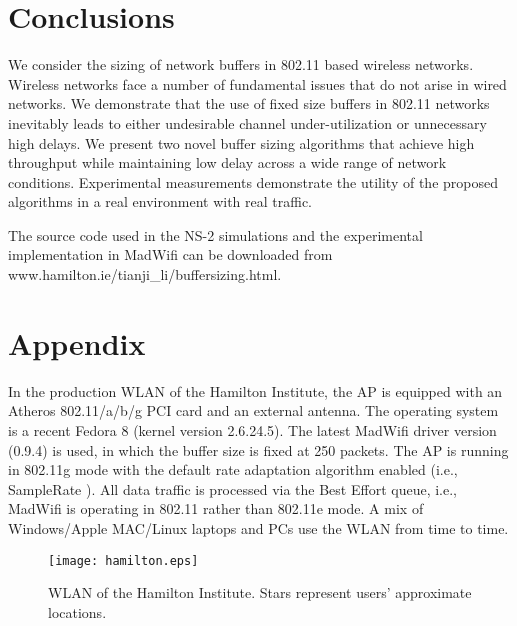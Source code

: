 \documentclass[10pt,twocolumn, journal]{IEEEtran}
\begin{document}
\section{Conclusions } \label{sec_concl}

We consider the sizing of network buffers in 802.11 based wireless networks.   Wireless
networks face a number of fundamental issues that do not arise in wired networks.  We
demonstrate that the use of fixed size buffers in 802.11 networks inevitably leads to
either undesirable channel under-utilization or unnecessary high delays.  We present two
novel buffer sizing algorithms that achieve high throughput while maintaining low delay across a wide range of network conditions.   Experimental measurements demonstrate the utility of the proposed algorithms  in a real environment with real traffic.

The source code used in the NS-2 simulations and the experimental implementation in
MadWifi can be downloaded from www.hamilton.ie/tianji\_li/buffersizing.html.



\section*{Appendix}

In the production WLAN of the Hamilton Institute, the AP is equipped with an Atheros 802.11/a/b/g PCI card and an external antenna. The operating system is a recent Fedora 8 (kernel version 2.6.24.5). The latest MadWifi driver version (0.9.4) is used, in which the buffer size is fixed at 250 packets. The AP is running in 802.11g mode with the default rate adaptation algorithm enabled (i.e., SampleRate \cite{Bicket_msthesis_2005}). All data traffic is processed via the Best
Effort queue, i.e., MadWifi is operating in 802.11 rather than 802.11e mode. A
mix of Windows/Apple MAC/Linux laptops and PCs use the WLAN from time to time.

\begin{figure}[b]
    \centering
    \texttt{[image: hamilton.eps]}
    \caption{WLAN of the Hamilton Institute. Stars represent users' approximate locations.}
    \label{fig_hi_topo}
\end{figure}
\end{document}
